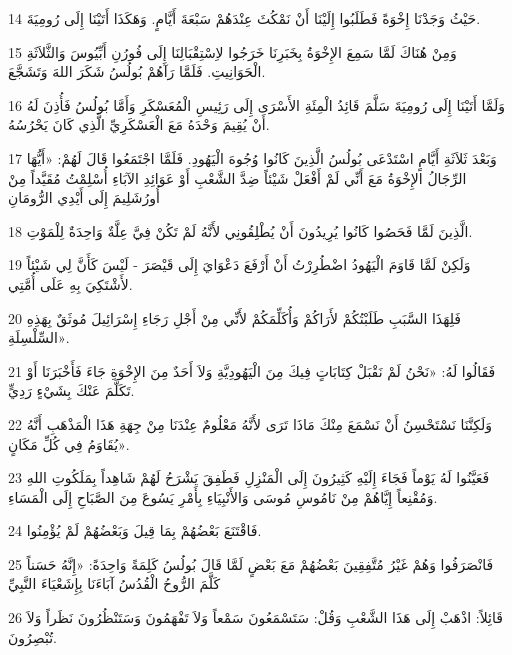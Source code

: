 \par 14 حَيْثُ وَجَدْنَا إِخْوَةً فَطَلَبُوا إِلَيْنَا أَنْ نَمْكُثَ عِنْدَهُمْ سَبْعَةَ أَيَّامٍ. وَهَكَذَا أَتَيْنَا إِلَى رُومِيَةَ.
\par 15 وَمِنْ هُنَاكَ لَمَّا سَمِعَ الإِخْوَةُ بِخَبَرِنَا خَرَجُوا لاِسْتِقْبَالِنَا إِلَى فُورُنِ أَبِّيُوسَ وَالثَّلاَثَةِ الْحَوَانِيتِ. فَلَمَّا رَآهُمْ بُولُسُ شَكَرَ اللهَ وَتَشَجَّعَ.
\par 16 وَلَمَّا أَتَيْنَا إِلَى رُومِيَةَ سَلَّمَ قَائِدُ الْمِئَةِ الأَسْرَى إِلَى رَئِيسِ الْمُعَسْكَرِ وَأَمَّا بُولُسُ فَأُذِنَ لَهُ أَنْ يُقِيمَ وَحْدَهُ مَعَ الْعَسْكَرِيِّ الَّذِي كَانَ يَحْرُسُهُ.
\par 17 وَبَعْدَ ثَلاَثَةِ أَيَّامٍ اسْتَدْعَى بُولُسُ الَّذِينَ كَانُوا وُجُوهَ الْيَهُودِ. فَلَمَّا اجْتَمَعُوا قَالَ لَهُمْ: «أَيُّهَا الرِّجَالُ الإِخْوَةُ مَعَ أَنِّي لَمْ أَفْعَلْ شَيْئاً ضِدَّ الشَّعْبِ أَوْ عَوَائِدِ الآبَاءِ أُسْلِمْتُ مُقَيَّداً مِنْ أُورُشَلِيمَ إِلَى أَيْدِي الرُّومَانِ
\par 18 الَّذِينَ لَمَّا فَحَصُوا كَانُوا يُرِيدُونَ أَنْ يُطْلِقُونِي لأَنَّهُ لَمْ تَكُنْ فِيَّ عِلَّةٌ وَاحِدَةٌ لِلْمَوْتِ.
\par 19 وَلَكِنْ لَمَّا قَاوَمَ الْيَهُودُ اضْطُرِرْتُ أَنْ أَرْفَعَ دَعْوَايَ إِلَى قَيْصَرَ - لَيْسَ كَأَنَّ لِي شَيْئاً لأَشْتَكِيَ بِهِ عَلَى أُمَّتِي.
\par 20 فَلِهَذَا السَّبَبِ طَلَبْتُكُمْ لأَرَاكُمْ وَأُكَلِّمَكُمْ لأَنِّي مِنْ أَجْلِ رَجَاءِ إِسْرَائِيلَ مُوثَقٌ بِهَذِهِ السِّلْسِلَةِ».
\par 21 فَقَالُوا لَهُ: «نَحْنُ لَمْ نَقْبَلْ كِتَابَاتٍ فِيكَ مِنَ الْيَهُودِيَّةِ وَلاَ أَحَدٌ مِنَ الإِخْوَةِ جَاءَ فَأَخْبَرَنَا أَوْ تَكَلَّمَ عَنْكَ بِشَيْءٍ رَدِيٍّ.
\par 22 وَلَكِنَّنَا نَسْتَحْسِنُ أَنْ نَسْمَعَ مِنْكَ مَاذَا تَرَى لأَنَّهُ مَعْلُومٌ عِنْدَنَا مِنْ جِهَةِ هَذَا الْمَذْهَبِ أَنَّهُ يُقَاوَمُ فِي كُلِّ مَكَانٍ».
\par 23 فَعَيَّنُوا لَهُ يَوْماً فَجَاءَ إِلَيْهِ كَثِيرُونَ إِلَى الْمَنْزِلِ فَطَفِقَ يَشْرَحُ لَهُمْ شَاهِداً بِمَلَكُوتِ اللهِ وَمُقْنِعاً إِيَّاهُمْ مِنْ نَامُوسِ مُوسَى وَالأَنْبِيَاءِ بِأَمْرِ يَسُوعَ مِنَ الصَّبَاحِ إِلَى الْمَسَاءِ.
\par 24 فَاقْتَنَعَ بَعْضُهُمْ بِمَا قِيلَ وَبَعْضُهُمْ لَمْ يُؤْمِنُوا.
\par 25 فَانْصَرَفُوا وَهُمْ غَيْرُ مُتَّفِقِينَ بَعْضُهُمْ مَعَ بَعْضٍ لَمَّا قَالَ بُولُسُ كَلِمَةً وَاحِدَةً: «إِنَّهُ حَسَناً كَلَّمَ الرُّوحُ الْقُدُسُ آبَاءَنَا بِإِشَعْيَاءَ النَّبِيِّ
\par 26 قَائِلاً: اذْهَبْ إِلَى هَذَا الشَّعْبِ وَقُلْ: سَتَسْمَعُونَ سَمْعاً وَلاَ تَفْهَمُونَ وَسَتَنْظُرُونَ نَظَراً وَلاَ تُبْصِرُونَ.
